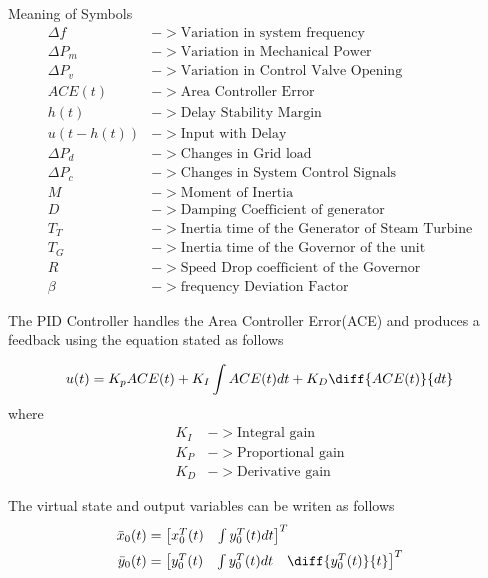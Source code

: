 \documentclass[journal]{IEEEtran}
\begin{document}
Meaning of Symbols
\begin{align}
  \Delta f &-> \text{Variation in system frequency}  \\
  \Delta P_m &-> \text{Variation in Mechanical Power} \\
  \Delta P_v &-> \text{Variation in Control Valve Opening} \\
  ACE(t) &-> \text{Area Controller Error} \\
  h(t) &-> \text{Delay Stability Margin} \\
  u(t-h(t)) &-> \text{Input with Delay} \\
  \Delta P_d &-> \text{Changes in Grid load} \\
  \Delta P_c &-> \text{Changes in System Control  Signals} \\
  M &-> \text{Moment of Inertia} \\
  D &-> \text{Damping Coefficient of generator} \\
  T_T &-> \text{Inertia time of the Generator of Steam Turbine} \\
  T_G &-> \text{Inertia time of the Governor of the unit } \\
  R &-> \text{Speed Drop coefficient of the Governor} \\
  \beta &-> \text{frequency Deviation Factor} 
\end{align} 

The PID Controller handles the Area Controller Error(ACE) and produces a feedback 
using the equation stated as follows

\begin{equation}
  u(t)=K_pACE(t) + K_I\int ACE(t)dt + K_D \diff{ACE(t)}{dt}
\end{equation}
where
\begin{align}
  K_I &-> \text{Integral gain}\\
  K_P &-> \text{Proportional gain} \\
K_D &->\text{Derivative gain}
\end{align}


The virtual state and output variables can be writen as follows
\begin{align}
  \bar{x}_0(t) &= 
  \begin{bmatrix}
    x_0^T(t) & \int y_0^T(t) dt
  \end{bmatrix}^T \\
  \bar{y}_0(t) &= 
  \begin{bmatrix}
    y_0^T(t) & \int y_0^T(t)dt & \diff{y_0^T(t)}{t}
  \end{bmatrix}^T
\end{align}
\end{document}
